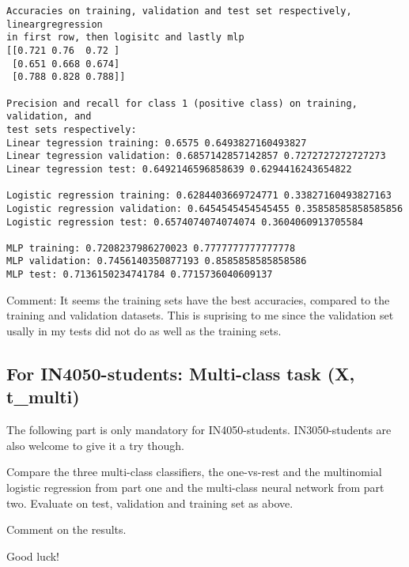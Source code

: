 \documentclass[11pt]{article}
\begin{document}
    \begin{Verbatim}[commandchars=\\\{\}]
Accuracies on training, validation and test set respectively, lineargregression
in first row, then logisitc and lastly mlp
[[0.721 0.76  0.72 ]
 [0.651 0.668 0.674]
 [0.788 0.828 0.788]]

Precision and recall for class 1 (positive class) on training, validation, and
test sets respectively:
Linear tegression training: 0.6575 0.6493827160493827
Linear tegression validation: 0.6857142857142857 0.7272727272727273
Linear tegression test: 0.6492146596858639 0.6294416243654822

Logistic regression training: 0.6284403669724771 0.33827160493827163
Logistic regression validation: 0.6454545454545455 0.35858585858585856
Logistic regression test: 0.6574074074074074 0.3604060913705584

MLP training: 0.7208237986270023 0.7777777777777778
MLP validation: 0.7456140350877193 0.8585858585858586
MLP test: 0.7136150234741784 0.7715736040609137
    \end{Verbatim}

    Comment: It seems the training sets have the best accuracies, compared
to the training and validation datasets. This is suprising to me since
the validation set usally in my tests did not do as well as the training
sets.

    \hypertarget{for-in4050-students-multi-class-task-x-t_multi}{%
\subsection{For IN4050-students: Multi-class task (X,
t\_multi)}\label{for-in4050-students-multi-class-task-x-t_multi}}

The following part is only mandatory for IN4050-students.
IN3050-students are also welcome to give it a try though.

Compare the three multi-class classifiers, the one-vs-rest and the
multinomial logistic regression from part one and the multi-class neural
network from part two. Evaluate on test, validation and training set as
above.

Comment on the results.

    Good luck!


    
    
    
\end{document}
